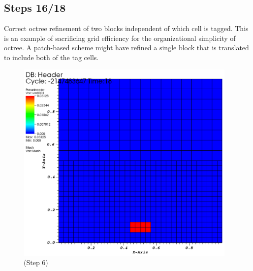 \documentclass[12pt,letterpaper]{article}
\begin{document}
\subsection{Steps 16/18}
Correct octree refinement of two blocks independent of which cell is tagged.
This is an example of sacrificing grid efficiency for the organizational
simplicity of octree.  A patch-based scheme might have refined a single block
that is translated to include both of the tag cells.
\begin{figure}[!hp]
\begin{center}
\includegraphics[width=4.25in]{TestRefine_Step18_Both.png}
\caption{(Step 6) }
\end{center}
\end{figure}
\end{document}

